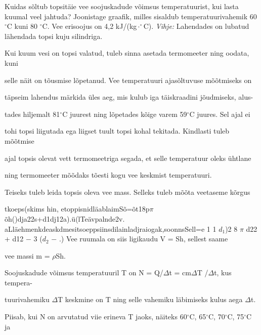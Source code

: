 
Kuidas sõltub topsitäie vee soojuskadude võimsus temperatuurist, kui lasta kuumal veel jahtuda? Joonistage graafik, milles sisaldub temperatuurivahemik 60 $^\circ$C kuni 80 $^\circ$C. Vee erisoojus on 4,2 kJ/(kg$\cdot^\circ$C).
\textit{Vihje:} Lahendades on lubatud lähendada topsi kuju silindriga.

\hint

\solu
Kui kuum vesi on topsi valatud, tuleb sinna asetada termomeeter ning oodata, kuni

selle näit on tõusmise lõpetanud. Vee temperatuuri ajasõltuvuse mõõtmiseks on

täpseim lahendus märkida üles aeg, mis kulub iga täiskraadini jõudmiseks, alus-

tades hiljemalt 81$^\circ$C juurest ning lõpetades kõige varem 59$^\circ$C juures. Sel ajal ei

tohi topsi liigutada ega liigset tuult topsi kohal tekitada. Kindlasti tuleb mõõtmise

ajal topsis olevat vett termomeetriga segada, et selle temperatuur oleks ühtlane

ning termomeeter mõõdaks tõesti kogu vee keskmist temperatuuri.

Teiseks tuleb leida topsis oleva vee mass. Selleks tuleb mõõta veetaseme kõrgus

tkoeps(skims hin, etoppisnidläablaimSõ=õt18p$\pi$õh()dja22s+d1dj12a).ü(lTeävpalnde2v. aLläehmenkdeaskdmesitsoeppsiinsdilainladjraiogak,soonnsSell=e 1 1 $d_1$)2 8 $\pi$ d22 + d12 $-$ 3 ($d_2$ $-$ .) Vee ruumala on siis ligikaudu V = Sh, sellest saame

vee massi m = $\rho$Sh.

Soojuskadude võimsus temperatuuril T on N = Q/$\Delta$t = cm$\Delta$T /$\Delta$t, kus tempera-

tuurivahemiku $\Delta$T keskmine on T ning selle vahemiku läbimiseks kulus aega $\Delta$t.

Piisab, kui N on arvutatud viie erineva T jaoks, näiteks 60$^\circ$C, 65$^\circ$C, 70$^\circ$C, 75$^\circ$C ja

